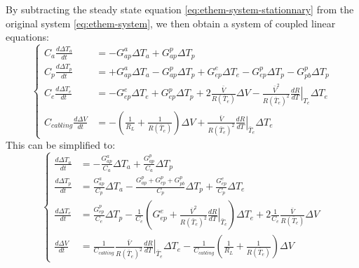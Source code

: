 By subtracting the steady state equation \ref{eq:ethem-system-stationnary} from the original system \ref{eq:ethem-system}, we then obtain a system of coupled linear equations:
\begin{equation}
\label{eq:ethem-system-temp}
\begin{cases}
\displaystyle C_a \frac{d \Delta T_a}{d t}
	&= -G_{ap}^a \Delta T_a + G_{ap}^p \Delta T_p 
	 \\[10pt]
\displaystyle C_p \frac{d \Delta T_p}{d t} 
	&= +G_{ap}^a \Delta T_a - G_{ap}^p \Delta T_p
	+ G_{ep}^e \Delta T_e - G_{ep}^p \Delta T_p
	- G_{pb}^p \Delta T_p
	 \\[10pt]
\displaystyle C_e \frac{d \Delta T_e}{d t}
	&= - G_{ep}^e \Delta T_e + G_{ep}^p \Delta T_p
	+2\frac{\bar{V}}{R(\bar{T}_e)} \Delta V - \frac{\bar{V}^2}{R(\bar{T}_e)^2} \left.\frac{d R}{d T}\right\vert_{T_e} \Delta T_e
 	 \\[10pt]
\displaystyle C_{cabling} \frac{d \Delta V}{d t} &= - \left( \frac{1}{R_L} + \frac{1}{R(\bar{T}_e)} \right) \Delta V + \frac{\bar{V}}{R(\bar{T}_e)^2} \left.\frac{d R}{d T}\right\vert_{\bar{T}_e} \Delta T_e
\end{cases}
\end{equation}
This can be simplified to:
\begin{equation}
\label{eq:ethem-system-temp-simplified}
\begin{cases}
\displaystyle \frac{d \Delta T_a}{d t}
	&= -\frac{G_{ap}^a}{C_a} \Delta T_a + \frac{G_{ap}^p}{C_a} \Delta T_p 
	 \\[10pt]
\displaystyle \frac{d \Delta T_p}{d t} 
	&= \frac{G_{ap}^a}{C_p} \Delta T_a - \frac{G_{ap}^p+G_{ep}^p+G_{pb}^p}{C_p} \Delta T_p	+ \displaystyle \frac{G_{ep}^e }{C_p}\Delta T_e
	 \\[10pt]
\displaystyle \frac{d \Delta T_e}{d t}
	&= \frac{G_{ep}^p}{C_e} \Delta T_p - \frac{1}{C_e} \left(G_{ep}^e + \frac{\bar{V}^2}{R(\bar{T}_e)^2} \left.\frac{d R}{d T}\right\vert_{\bar{T}_e}\right) \Delta T_e 
	+2 \frac{1}{C_e} \frac{\bar{V}}{R(\bar{T}_e)} \Delta V
 	 \\[10pt]
\displaystyle \frac{d \Delta V}{d t} &= \frac{1}{C_{cabling}} \frac{\bar{V}}{R(\bar{T}_e)^2} \left.\frac{d R}{d T}\right\vert_{\bar{T}_e} \Delta T_e - \frac{1}{C_{cabling}}\left( \frac{1}{R_L} + \frac{1}{R(\bar{T}_e)} \right) \Delta V
\end{cases}
\end{equation}

